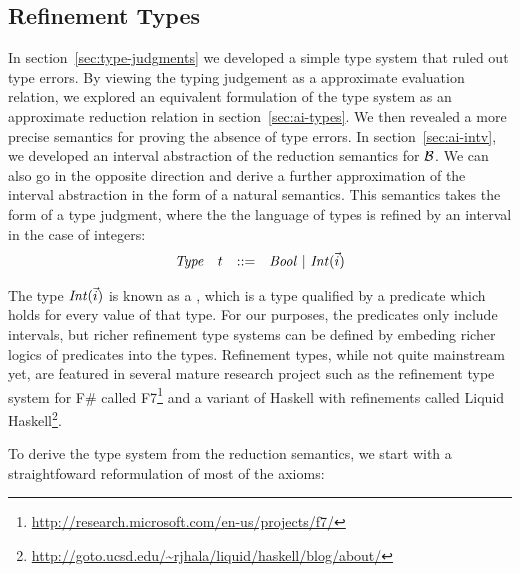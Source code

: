 \subsection{Refinement Types}

In section~\ref{sec:type-judgments} we developed a simple type system
that ruled out type errors.  By viewing the typing judgement as a
approximate evaluation relation, we explored an equivalent formulation
of the type system as an approximate reduction relation in
section~\ref{sec:ai-types}.  We then revealed a more precise semantics
for proving the absence of type errors.  In section~\ref{sec:ai-intv},
we developed an interval abstraction of the reduction semantics for
$\mathcal{B}$.  We can also go in the opposite direction and derive a
further approximation of the interval abstraction in the form of a
natural semantics.  This semantics takes the form of a type judgment,
where the the language of types is refined by an interval in the case
of integers:
\[
\begin{array}{llcl}
\mathit{Type}  & t & ::= & \mathit{Bool}\ |\ \mathit{Int}(\vec{i})
\end{array}
\]

The type $\mathit{Int}(\vec{i})$ is known as a , which
is a type qualified by a predicate which holds for every value of that
type.  For our purposes, the predicates only include intervals, but
richer refinement type systems can be defined by embeding richer
logics of predicates into the types.  Refinement types, while not
quite mainstream yet, are featured in several mature research project
such as the refinement type system for F\# called
F7\footnote{\url{http://research.microsoft.com/en-us/projects/f7/}}
and a variant of Haskell with refinements called Liquid
Haskell\footnote{\url{http://goto.ucsd.edu/~rjhala/liquid/haskell/blog/about/}}.

To derive the type system from the reduction semantics, we start with
a straightfoward reformulation of most of the axioms:

